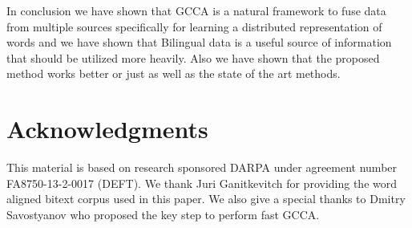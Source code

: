 \documentclass[11pt]{article}
\begin{document}
In conclusion we have shown that GCCA is a natural framework to fuse data from
multiple sources specifically for learning a distributed
representation of words and we have shown that Bilingual data is a useful
source of information that should be utilized more heavily. Also we
have shown that the proposed method works better or just as well as
the state of the art methods.
\section*{Acknowledgments}
This material is based on research sponsored DARPA under agreement
number FA8750-13-2-0017 (DEFT). We thank Juri Ganitkevitch for
providing the word aligned bitext corpus used in this paper. We also
give a special thanks to Dmitry Savostyanov 
who proposed the key step to perform fast GCCA.


\end{document}

